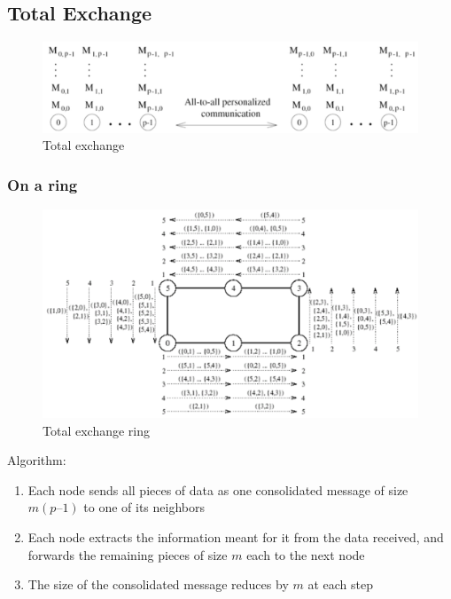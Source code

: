 \documentclass[11pt,a4paper]{report}
\begin{document}
\subsection{Total Exchange}

\begin{figure}[H]
\centering
\includegraphics[width=0.7\linewidth]{img/comm_total-exchange}
\caption{Total exchange}
\label{fig:commtotal-exchange}
\end{figure}

\subsubsection{On a ring}

\begin{figure}[H]
    \centering
    \includegraphics[width=0.7\linewidth]{img/comm_ring_totalexchange}
    \caption{Total exchange ring}
    \label{fig:commringtotalexchange}
\end{figure}

Algorithm:

\begin{enumerate}
    \item Each node sends all pieces of data as one consolidated message of 
    size $m(p – 1)$ to one of its neighbors
    
    \item Each node extracts the information meant for it from the data 
    received, and forwards the remaining pieces of size $m$ each to the next 
    node
    
    \item The size of the consolidated message reduces by $m$ at each step
\end{enumerate}
\end{document}

